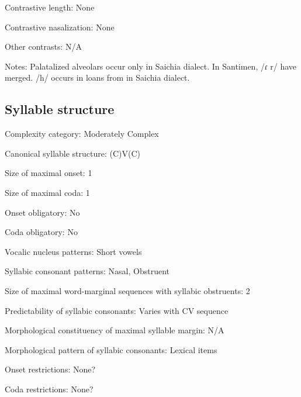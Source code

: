 {\begin{appendixdesc}
\item[Contrastive length:] None

\item[Contrastive nasalization:] None

\item[Other contrasts:] N/A

\item[Notes:] Palatalized alveolars occur only in Saichia dialect. In Santimen, /ɾ r/ have merged. /h/ occurs in loans from  in Saichia dialect.
\end{appendixdesc}
\subsection*{Syllable structure}
\begin{appendixdesc}

\item[Complexity category:] Moderately Complex

\item[Canonical syllable structure:] (C)V(C) \citep[31--34]{Chang2006}

\item[Size of maximal onset:] 1

\item[Size of maximal coda:] 1

\item[Onset obligatory:] No

\item[Coda obligatory:] No

\item[Vocalic nucleus patterns:] Short vowels

\item[Syllabic consonant patterns:] Nasal, Obstruent

\item[Size of maximal word-marginal sequences with syllabic obstruents:] 2

\item[Predictability of syllabic consonants:] Varies with CV sequence

\item[Morphological constituency of maximal syllable margin:] N/A

\item[Morphological pattern of syllabic consonants:] Lexical items

\item[Onset restrictions:] None?

\item[Coda restrictions:] None?


\end{appendixdesc}}
